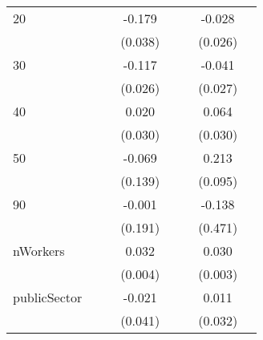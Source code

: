 \begin{longtable}{l*{3}{c}|l*{3}{c}}
		20                  &                     &                     &      -0.179\sym{***}&                     &                     &      -0.028         \\
		&                     &                     &     (0.038)         &                     &                     &     (0.026)         \\
		30                  &                     &                     &      -0.117\sym{***}&                     &                     &      -0.041         \\
		&                     &                     &     (0.026)         &                     &                     &     (0.027)         \\
		40                  &                     &                     &       0.020         &                     &                     &       0.064\sym{*}  \\
		&                     &                     &     (0.030)         &                     &                     &     (0.030)         \\
		50                  &                     &                     &      -0.069         &                     &                     &       0.213\sym{*}  \\
		&                     &                     &     (0.139)         &                     &                     &     (0.095)         \\
		90                  &                     &                     &      -0.001         &                     &                     &      -0.138         \\
		&                     &                     &     (0.191)         &                     &                     &     (0.471)         \\
		nWorkers            &                     &                     &       0.032\sym{***}&                     &                     &       0.030\sym{***}\\
		&                     &                     &     (0.004)         &                     &                     &     (0.003)         \\
		publicSector      &                     &                     &      -0.021         &                     &                     &       0.011         \\
		&                     &                     &     (0.041)         &                     &                     &     (0.032)         \\

\end{longtable}
